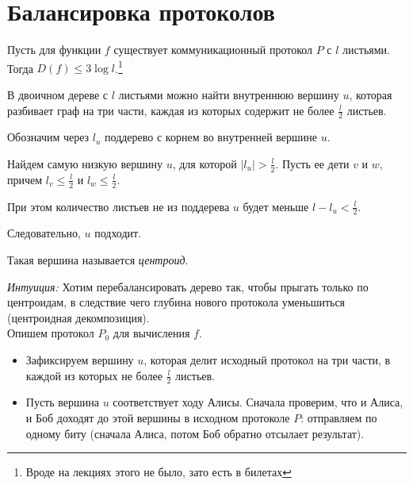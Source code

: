 \section{Балансировка протоколов}
\begin{thm}
	Пусть для функции $ f$ существует коммуникационный протокол $ P$ с $ l$ листьями. Тогда  $ D(f) \le 3 \log l$.\footnote{Вроде на лекциях этого не было, зато есть в билетах}
\end{thm}
\begin{proof*}
	\begin{lm}
	    В двоичном дереве с $ l$ листьями можно найти внутреннюю вершину  $ u$, которая разбивает граф на три части, каждая из которых содержит не более   $ \frac{l}{2}$ листьев.
	\end{lm}
	\begin{proof*}
	    Обозначим через $ l_u$ поддерево с корнем во внутренней вершине $ u$.

		Найдем самую низкую вершину $ u$, для которой  $  \lvert l_u \rvert > \frac{l}{2}$. Пусть ее дети $ v $ и  $ w$, причем $ l_v \le \frac{l}{2}$  и $ l_w \le \frac{l}{2}$.

		При этом количество листьев не из поддерева $ u$ будет меньше  $ l - l_u < \frac{l}{2}$.

		Следовательно, $ u$ подходит.
	\end{proof*}
	
	\begin{note}
	Такая вершина называется \textit{центроид}.
	\end{note}
	
	\vspace{1em}
	\textit{Интуиция:} Хотим перебалансировать дерево так, чтобы прыгать только по центроидам, в следствие чего глубина нового протокола уменьшиться (центроидная декомпозиция).\\

    Опишем протокол $ P_0$ для вычисления  $ f$. 

	\begin{itemize}
		\item Зафиксируем вершину $ u$, которая делит исходный протокол на три части, в каждой из которых не более $  \frac{l}{2}$ листьев.
		\item Пусть вершина $ u$ соответствует ходу Алисы. 
			Сначала проверим, что и Алиса, и Боб доходят до этой вершины в исходном протоколе $ P$: отправляем по одному биту (сначала Алиса, потом Боб обратно отсылает результат).


\end{itemize}
\end{proof*}
